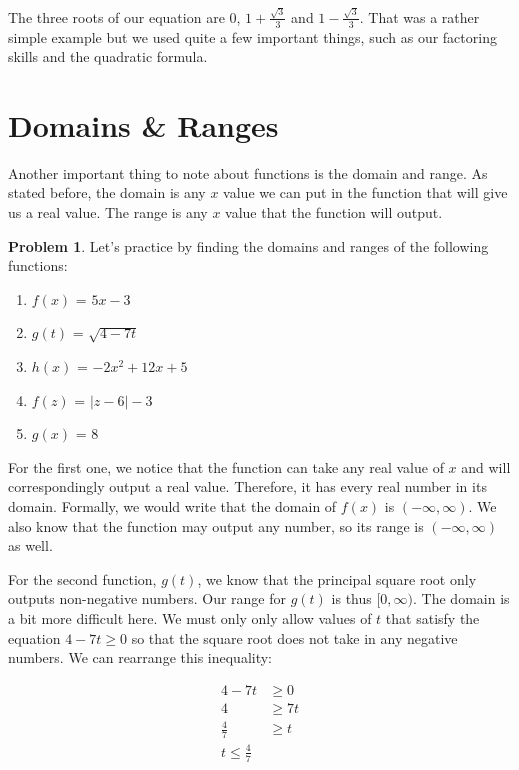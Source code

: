 \documentclass[12pt]{article}
\theoremstyle{definition}
\newtheorem{problem}{Problem}
\begin{document}
The three roots of our equation are $0$, $1 + \frac{\sqrt{3}}{3}$ and $1 - \frac{\sqrt{3}}{3}$.
That was a rather simple example but we used quite a few important things, such as our factoring skills and the quadratic formula.

\section{Domains \& Ranges}
Another important thing to note about functions is the domain and range.
As stated before, the domain is any $x$ value we can put in the function that will give us a real value.
The range is any $x$ value that the function will output.

\begin{problem}
Let's practice by finding the domains and ranges of the following functions:

\begin{enumerate}
    \item $f(x)$ = $5x-3$
    \item $g(t)$ = $\sqrt{4-7t}$
    \item $h(x)$ = $-2x^2+12x+5$
    \item $f(z)$ = $|z-6|-3$
    \item $g(x)$ = $8$
\end{enumerate}
\end{problem}

For the first one, we notice that the function can take any real value of $x$ and will correspondingly output a real value.
Therefore, it has every real number in its domain. Formally, we would write that the domain of $f(x)$ is $(-\infty , \infty)$.
We also know that the function may output any number, so its range is $(-\infty , \infty)$ as well.

For the second function, $g(t)$, we know that the principal square root only outputs non-negative numbers.
Our range for $g(t)$ is thus $[0, \infty)$.
                The domain is a bit more difficult here.
                We must only only allow values of $t$ that satisfy the equation $4-7t\geq0$ so that the square root does not take in any negative numbers.
                We can rearrange this inequality:

                \begin{align}
                    4-7t        & \geq 0  \\
                    4           & \geq 7t \\
                    \frac{4}{7} & \geq t  \\
                    t \leq \frac{4}{7}
                \end{align}
\end{document}
